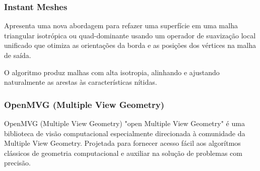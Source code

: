 

\begin{frame}
\frametitle{Instant Meshes}

Apresenta uma nova abordagem para refazer uma superfície em uma malha
  triangular isotrópica ou quad-dominante usando um operador de suavização
  local unificado que otimiza as orientações da borda e as posições dos
  vértices na malha de saída.

  O algoritmo produz malhas com alta isotropia, alinhando e ajustando
  naturalmente as arestas às características nítidas.
\end{frame}

\begin{frame}
\frametitle{OpenMVG (Multiple View Geometry)}

OpenMVG (Multiple View Geometry) "open Multiple View Geometry" é uma
  biblioteca de visão computacional especialmente
  direcionada à comunidade da Multiple View Geometry. Projetada para
  fornecer acesso fácil aos algorítmos clássicos de geometria computacional e
  auxiliar na solução de problemas com precisão.

\end{frame}
